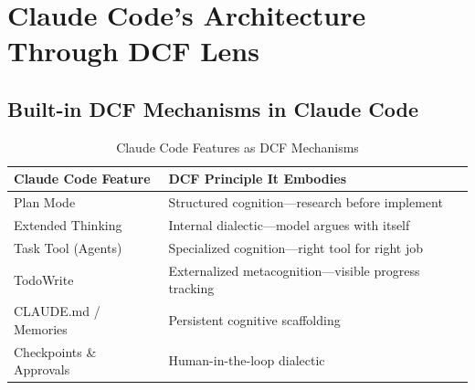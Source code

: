 \chapter{Claude Code's Architecture Through DCF Lens}

\section{Built-in DCF Mechanisms in Claude Code}

\begin{table}[H]
\centering
\begin{tabular}{ll}
\toprule
\textbf{Claude Code Feature} & \textbf{DCF Principle It Embodies} \\
\midrule
Plan Mode & Structured cognition---research before implement \\
Extended Thinking & Internal dialectic---model argues with itself \\
Task Tool (Agents) & Specialized cognition---right tool for right job \\
TodoWrite & Externalized metacognition---visible progress tracking \\
CLAUDE.md / Memories & Persistent cognitive scaffolding \\
Checkpoints \& Approvals & Human-in-the-loop dialectic \\
\bottomrule
\end{tabular}
\caption{Claude Code Features as DCF Mechanisms}
\end{table}

